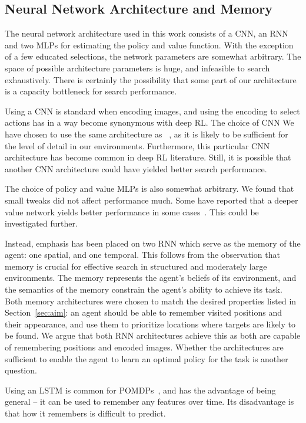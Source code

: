 \subsection{Neural Network Architecture and Memory}

The neural network architecture used in this work consists of a CNN, an RNN and two MLPs for estimating the policy and value function.
With the exception of a few educated selections, the network parameters are somewhat arbitrary.
The space of possible architecture parameters is huge, and infeasible to search exhaustively.
There is certainly the possibility that some part of our architecture is a capacity bottleneck for search performance.

Using a CNN is standard when encoding images, and using the encoding to select actions has in a way become synonymous with deep RL.
The choice of CNN 
We have chosen to use the same architecture as ~\cite{mnih_playing_2013}, as it is likely to be sufficient for the level of detail in our environments.
Furthermore, this particular CNN architecture has become common in deep RL literature.
Still, it is possible that another CNN architecture could have yielded better search performance.

The choice of policy and value MLPs is also somewhat arbitrary.
We found that small tweaks did not affect performance much.
Some have reported that a deeper value network yields better performance in some cases~\cite{andrychowicz_what_2020}.
This could be investigated further.

Instead, emphasis has been placed on two RNN which serve as the memory of the agent: one spatial, and one temporal.
This follows from the observation that memory is crucial for effective search in structured and moderately large environments.
The memory represents the agent's beliefs of its environment, and the semantics of the memory constrain the agent's ability to achieve its task.
Both memory architectures were chosen to match the desired properties listed in Section~\ref{sec:aim}:
an agent should be able to remember visited positions and their appearance, and use them to prioritize locations where targets are likely to be found.
We argue that both RNN architectures achieve this as both are capable of remembering positions and encoded images.
Whether the architectures are sufficient to enable the agent to learn an optimal policy for the task is another question.

Using an LSTM is common for POMDPs~\cite{hausknecht_deep_2017,mnih_asynchronous_2016,mirowski_learning_2017}, and has the advantage of being general --
it can be used to remember any features over time.
Its disadvantage is that how it remembers is difficult to predict.

